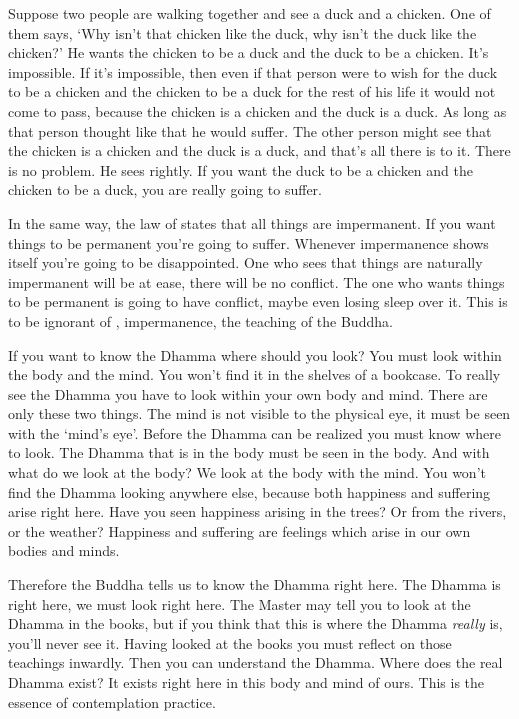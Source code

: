 Suppose two people are walking together and see a duck and a chicken. One of them says, `Why isn't that chicken like the duck, why isn't the duck like the chicken?' He wants the chicken to be a duck and the duck to be a chicken. It's impossible. If it's impossible, then even if that person were to wish for the duck to be a chicken and the chicken to be a duck for the rest of his life it would not come to pass, because the chicken is a chicken and the duck is a duck. As long as that person thought like that he would suffer. The other person might see that the chicken is a chicken and the duck is a duck, and that's all there is to it. There is no problem. He sees rightly. If you want the duck to be a chicken and the chicken to be a duck, you are really going to suffer.

In the same way, the law of  states that all things are impermanent. If you want things to be permanent you're going to suffer. Whenever impermanence shows itself you're going to be disappointed. One who sees that things are naturally impermanent will be at ease, there will be no conflict. The one who wants things to be permanent is going to have conflict, maybe even losing sleep over it. This is to be ignorant of , impermanence, the teaching of the Buddha.

If you want to know the Dhamma where should you look? You must look within the body and the mind. You won't find it in the shelves of a bookcase. To really see the Dhamma you have to look within your own body and mind. There are only these two things. The mind is not visible to the physical eye, it must be seen with the `mind's eye'. Before the Dhamma can be realized you must know where to look. The Dhamma that is in the body must be seen in the body. And with what do we look at the body? We look at the body with the mind. You won't find the Dhamma looking anywhere else, because both happiness and suffering arise right here. Have you seen happiness arising in the trees? Or from the rivers, or the weather? Happiness and suffering are feelings which arise in our own bodies and minds.

Therefore the Buddha tells us to know the Dhamma right here. The Dhamma is right here, we must look right here. The Master may tell you to look at the Dhamma in the books, but if you think that this is where the Dhamma \textit{really} is, you'll never see it. Having looked at the books you must reflect on those teachings inwardly. Then you can understand the Dhamma. Where does the real Dhamma exist? It exists right here in this body and mind of ours. This is the essence of contemplation practice.

